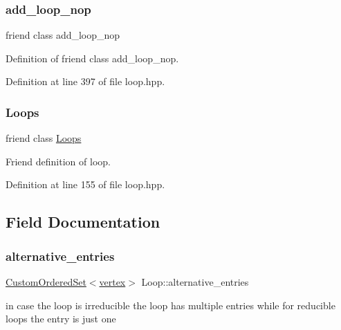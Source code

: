 \subsubsection{\texorpdfstring{add\+\_\+loop\+\_\+nop}{add\_loop\_nop}}
{\footnotesize\ttfamily friend class add\+\_\+loop\+\_\+nop\hspace{0.3cm}{\ttfamily [friend]}}



Definition of friend class add\+\_\+loop\+\_\+nop. 



Definition at line 397 of file loop.\+hpp.

\mbox{\label{classLoop_a90dc76c4683e3f7821ce69689196b744}} 
\subsubsection{\texorpdfstring{Loops}{Loops}}
{\footnotesize\ttfamily friend class \hyperlink{classLoops}{Loops}\hspace{0.3cm}{\ttfamily [friend]}}



Friend definition of loop. 



Definition at line 155 of file loop.\+hpp.



\subsection{Field Documentation}
\mbox{\label{classLoop_a56e71239ca4a6ae07f70c2509610464f}} 
\subsubsection{\texorpdfstring{alternative\+\_\+entries}{alternative\_entries}}
{\footnotesize\ttfamily \hyperlink{classCustomOrderedSet}{Custom\+Ordered\+Set}$<$\hyperlink{graph_8hpp_abefdcf0544e601805af44eca032cca14}{vertex}$>$ Loop\+::alternative\+\_\+entries\hspace{0.3cm}{\ttfamily [private]}}



in case the loop is irreducible the loop has multiple entries while for reducible loops the entry is just one 



